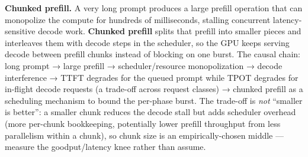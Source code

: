\textbf{Chunked prefill.} A very long prompt produces a large prefill
operation that can monopolize the compute for hundreds of milliseconds,
stalling concurrent latency-sensitive decode work. \textbf{Chunked
prefill} splits that prefill into smaller pieces and interleaves them
with decode steps in the scheduler, so the GPU keeps serving decode
between prefill chunks instead of blocking on one burst. The causal
chain: long prompt → large prefill → scheduler/resource monopolization →
decode interference → TTFT degrades for the queued prompt while TPOT
degrades for in-flight decode requests (a trade-off across request
classes) → chunked prefill as a scheduling mechanism to bound the
per-phase burst. The trade-off is \emph{not} ``smaller is better'': a
smaller chunk reduces the decode stall but adds scheduler overhead (more
per-chunk bookkeeping, potentially lower prefill throughput from less
parallelism within a chunk), so chunk size is an empirically-chosen
middle --- measure the goodput/latency knee rather than assume.

\label{common-mistakes}


